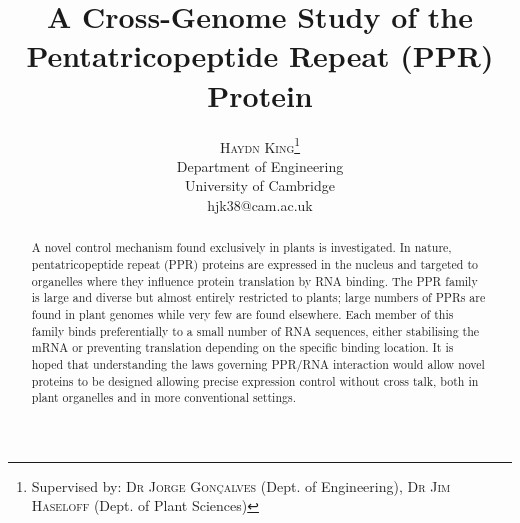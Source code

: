 \documentclass[twoside,a4paper]{article}
\title{\vspace{-15mm}\fontsize{24pt}{10pt}\selectfont\textbf{A Cross-Genome
Study of the Pentatricopeptide Repeat (PPR) Protein}} %
\author{
\large
\textsc{Haydn King}\thanks{Supervised by: \textsc{Dr Jorge Gon\c{c}alves} 
(Dept. of Engineering), \textsc{Dr Jim Haseloff} 
(Dept. of Plant Sciences)}\\[2mm] %
\normalsize Department of Engineering \\
\normalsize University of Cambridge \\ %
\normalsize hjk38@cam.ac.uk %
\vspace{-5mm}
}
\date{}
\begin{document}
\maketitle %

\thispagestyle{fancy} %


\begin{abstract}

\noindent A novel control mechanism found exclusively in plants is
investigated. 
In nature, pentatricopeptide repeat (PPR) proteins are expressed in the nucleus
and targeted to organelles where they influence protein translation by RNA
binding.
The PPR family is large and diverse but almost entirely restricted to plants; 
large numbers of PPRs are found in plant genomes while very few are found
elsewhere.
Each member of this family binds preferentially to a small number of RNA
sequences, either stabilising the mRNA or preventing translation depending on
the specific binding location.
It is hoped that understanding the laws governing PPR/RNA interaction would
allow novel proteins to be designed allowing precise expression control without
cross talk, both in plant organelles and in more conventional settings.

\end{abstract}

\end{document}
